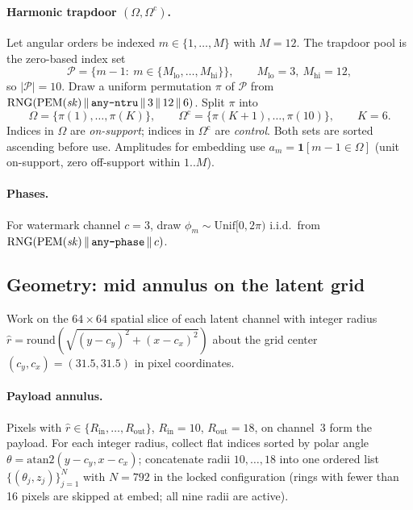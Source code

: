 \paragraph{Harmonic trapdoor \((\Omega,\Omega^{\mathrm c})\).}
Let angular orders be indexed \(m\in\{1,\ldots,M\}\) with \(M=12\).
The trapdoor pool is the zero-based index set
\[
\mathcal{P}=\{m-1:\ m\in\{M_{\mathrm{lo}},\ldots,M_{\mathrm{hi}}\}\},
\qquad M_{\mathrm{lo}}=3,\ M_{\mathrm{hi}}=12,
\]
so \(|\mathcal{P}|=10\).
Draw a uniform permutation \(\pi\) of \(\mathcal{P}\) from
\(\mathrm{RNG}(\mathrm{PEM}(\mathit{sk})\,\|\,\text{\texttt{any-ntru}}\,\|\,3\,\|\,12\,\|\,6)\).
Split \(\pi\) into
\[
\Omega=\{\pi(1),\ldots,\pi(K)\},\qquad
\Omega^{\mathrm c}=\{\pi(K+1),\ldots,\pi(10)\},
\qquad K=6.
\]
Indices in \(\Omega\) are \emph{on-support}; indices in \(\Omega^{\mathrm c}\) are
\emph{control}.
Both sets are sorted ascending before use.
Amplitudes for embedding use \(a_m=\mathbf{1}[m-1\in\Omega]\) (unit on-support, zero
off-support within \(1..M\)).

\paragraph{Phases.}
For watermark channel \(c=3\), draw
\(\phi_m\sim\mathrm{Unif}[0,2\pi)\) i.i.d.\ from
\(\mathrm{RNG}(\mathrm{PEM}(\mathit{sk})\,\|\,\text{\texttt{any-phase}}\,\|\,c)\).

\subsection{Geometry: mid annulus on the latent grid}
\label{sec:anyangle-geom}

Work on the \(64\times64\) spatial slice of each latent channel with integer
radius \(\hat r=\mathrm{round}(\sqrt{(y-c_y)^2+(x-c_x)^2})\) about the grid center
\((c_y,c_x)=(31.5,31.5)\) in pixel coordinates.

\paragraph{Payload annulus.}
Pixels with \(\hat r\in\{R_{\mathrm{in}},\ldots,R_{\mathrm{out}}\}\),
\(R_{\mathrm{in}}=10\), \(R_{\mathrm{out}}=18\), on channel~3 form the payload.
For each integer radius, collect flat indices sorted by polar angle
\(\theta=\mathrm{atan2}(y-c_y,x-c_x)\); concatenate radii
\(10,\ldots,18\) into one ordered list
\(\{( \theta_j, z_j)\}_{j=1}^{N}\) with \(N=792\) in the locked configuration
(rings with fewer than 16 pixels are skipped at embed; all nine radii are active).

